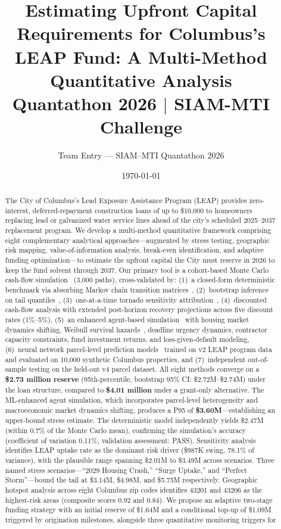 \documentclass[11pt, letterpaper]{article}
\title{
  \vspace{-1cm}
  \textbf{Estimating Upfront Capital Requirements for Columbus's LEAP Fund: A Multi-Method Quantitative Analysis} \\[0.4cm]
  \large Quantathon 2026 \(\mid\) SIAM-MTI Challenge
}
\author{Team Entry --- SIAM--MTI Quantathon 2026}
\date{\today}
\begin{document}
\maketitle
\thispagestyle{fancy}

\begin{abstract}
  The City of Columbus's Lead Exposure Assistance Program (LEAP) provides zero-interest, deferred-repayment construction loans of up to \$10,000 to homeowners replacing lead or galvanized water service lines ahead of the city's scheduled 2025--2037 replacement program. We develop a multi-method quantitative framework comprising eight complementary analytical approaches---augmented by stress testing, geographic risk mapping, value-of-information analysis, break-even identification, and adaptive funding optimization---to estimate the upfront capital the City must reserve in 2026 to keep the fund solvent through 2037. Our primary tool is a cohort-based Monte Carlo cash-flow simulation~\cite{rubinstein2016} (3{,}000 paths), cross-validated by: (1)~a closed-form deterministic benchmark via absorbing Markov chain transition matrices~\cite{kemeny1960}, (2)~bootstrap inference on tail quantiles~\cite{efron1979}, (3)~one-at-a-time tornado sensitivity attribution~\cite{eschenbach1992}, (4)~discounted cash-flow analysis with extended post-horizon recovery projections across five discount rates (1\%--5\%), (5)~an enhanced agent-based simulation~\cite{bonabeau2002} with housing market dynamics shifting, Weibull survival hazards~\cite{lawless2003}, deadline urgency dynamics, contractor capacity constraints, fund investment returns, and loss-given-default modeling, (6)~neural network parcel-level prediction models~\cite{goodfellow2016} trained on v2 LEAP program data and evaluated on 10{,}000 synthetic Columbus properties, and (7)~independent out-of-sample testing on the held-out v4 parcel dataset. All eight methods converge on a \textbf{\$2.73 million reserve} (95th-percentile, bootstrap 95\% CI: \$2.72M--\$2.74M) under the loan structure, compared to \textbf{\$4.01 million} under a grant-only alternative. The ML-enhanced agent simulation, which incorporates parcel-level heterogeneity and macroeconomic market dynamics shifting, produces a P95 of \textbf{\$3.60M}---establishing an upper-bound stress estimate. The deterministic model independently yields \$2.47M (within 0.7\% of the Monte Carlo mean), confirming the simulation's accuracy (coefficient of variation 0.11\%, validation assessment: PASS). Sensitivity analysis identifies LEAP uptake rate as the dominant risk driver (\$987K swing, 78.1\% of variance), with the plausible range spanning \$2.01M to \$3.49M across scenarios. Three named stress scenarios---``2029 Housing Crash,'' ``Surge Uptake,'' and ``Perfect Storm''---bound the tail at \$3.14M, \$4.98M, and \$5.75M respectively. Geographic hotspot analysis across eight Columbus zip codes identifies 43201 and 43206 as the highest-risk areas (composite scores 0.92 and 0.84). We propose an adaptive two-stage funding strategy with an initial reserve of \$1.64M and a conditional top-up of \$1.09M triggered by origination milestones, alongside three quantitative monitoring triggers for 
\end{abstract}
\end{document}
